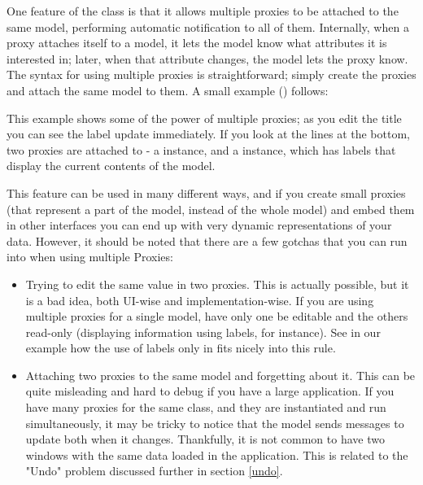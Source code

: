 \documentclass[a4paper]{howto}
\begin{document}
One feature of the  class is that it allows multiple
proxies to be attached to the same model, performing automatic
notification to all of them. Internally, when a proxy attaches itself to
a model, it lets the model know what attributes it is interested in;
later, when that attribute changes, the model lets the proxy know.  The
syntax for using multiple proxies is straightforward; simply create the
proxies and attach the same model to them. A small example
() follows:



This example shows some of the power of multiple proxies; as you edit
the title you can see the label update immediately. If you look at the
lines at the bottom, two proxies are attached to  - a
 instance, and a  instance, which has
labels that display the current contents of the model.

This feature can be used in many different ways, and if you create small
proxies (that represent a part of the model, instead of the whole model)
and embed them in other interfaces you can end up with very dynamic
representations of your data. However, it should be noted that there are
a few gotchas that you can run into when using multiple Proxies:

\begin{itemize}
\item Trying to edit the same value in two proxies. This is actually
possible, but it is a bad idea, both UI-wise and implementation-wise. If
you are using multiple proxies for a single model, have only one be
editable and the others read-only (displaying information using labels,
for instance). See in our example how the use of labels only in
 fits nicely into this rule.

\item Attaching two proxies to the same model and forgetting about it.
This can be quite misleading and hard to debug if you have a large
application. If you have many proxies for the same class, and they are
instantiated and run simultaneously, it may be tricky to notice that the
model sends messages to update both when it changes. Thankfully, it is
not common to have two windows with the same data loaded in the
application. This is related to the "Undo" problem discussed further in
section \ref{undo}.
\end{itemize}
\end{document}
